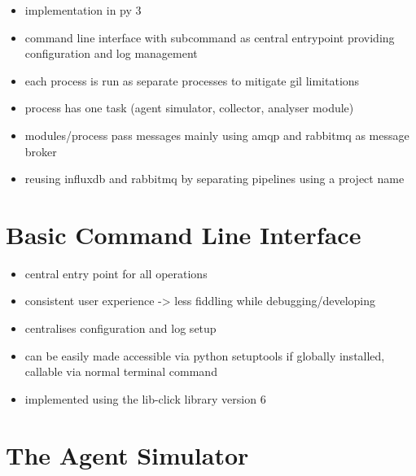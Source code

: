 
\begin{itemize}
	\item implementation in \gls{py} 3
	\item command line interface with subcommand as central entrypoint providing configuration and log management
	\item each process is run as separate processes to mitigate \gls{gil} limitations
	\item process has one task (agent simulator, collector, analyser module)
	\item modules/process pass messages mainly using \gls{amqp} and \gls{rabbitmq} as message broker
	\item reusing \gls{influxdb} and \gls{rabbitmq} by separating pipelines using a project name
\end{itemize}

\section{Basic Command Line Interface}
\label{sec:impl:cli}

\begin{itemize}
	\item central entry point for all operations
	\item consistent user experience -> less fiddling while debugging/developing
	\item centralises configuration and log setup
	\item can be easily made accessible via python setuptools
		\subitem if globally installed, callable via normal terminal command
	\item implemented using the \gls{lib-click} library version 6
\end{itemize}

\section{The Agent Simulator}
\label{sec:impl:agent}

